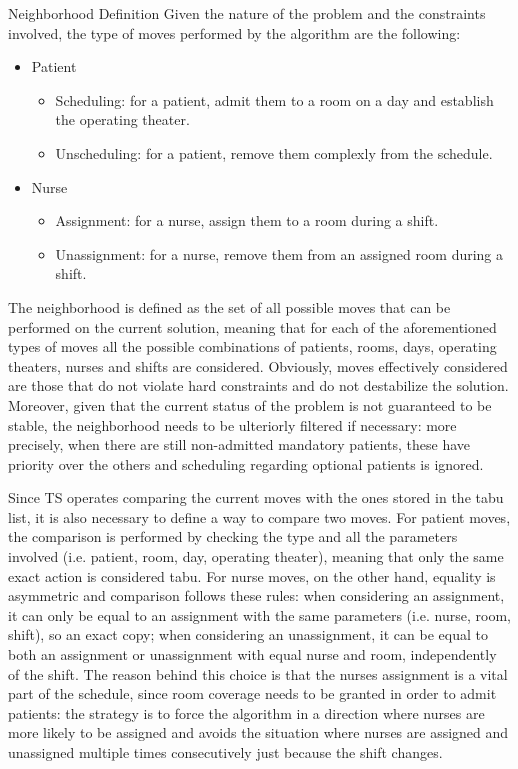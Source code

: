 \begin{section}
 \begin{subsection}
     {Neighborhood Definition}
     Given the nature of the problem and the constraints involved,
     the type of moves performed by the algorithm are the following:
     \begin{itemize}
         \item Patient
               \begin{itemize}
                   \item Scheduling: for a patient, admit them to a room on a day and establish the operating theater.
                   \item Unscheduling: for a patient, remove them complexly from the schedule.
               \end{itemize}
         \item Nurse
               \begin{itemize}
                   \item  Assignment: for a nurse, assign them to a room during a shift.
                   \item Unassignment: for a nurse, remove them from an assigned room during a shift.
               \end{itemize}
     \end{itemize}
     The neighborhood is defined as the set of all possible moves that can be performed
     on the current solution, meaning that for each of the aforementioned types of moves
     all the possible combinations of patients, rooms, days, operating theaters, nurses and shifts are considered.
     Obviously, moves effectively considered are those that do not violate hard constraints and do not destabilize the solution.
     Moreover, given that the current status of the problem is not guaranteed to be stable, the neighborhood
     needs to be ulteriorly filtered if necessary: more precisely, when there are still non-admitted mandatory patients,
     these have priority over the others and scheduling regarding optional patients is ignored.


     Since TS operates comparing the current moves with the ones stored in the tabu list, it is also necessary to
     define a way to compare two moves. For patient moves, the comparison is performed by checking
     the type and all the parameters involved (i.e. patient, room, day, operating theater),
     meaning that only the same exact action is considered tabu.
     For nurse moves, on the other hand, equality is asymmetric and comparison follows these rules:
     when considering an assignment, it can only be equal to an assignment with the same parameters (i.e. nurse, room, shift),
     so an exact copy;
     when considering an unassignment, it can be equal to both an assignment or unassignment with equal nurse and room,
     independently of the shift.
     The reason behind this choice is that the nurses assignment is a vital part of the schedule,
     since room coverage needs to be granted in order to admit patients:
     the strategy is to force the algorithm in a direction where nurses are more likely to be assigned and avoids the situation
     where nurses are assigned and unassigned multiple times consecutively just because the shift changes.


\end{subsection}
\end{section}
